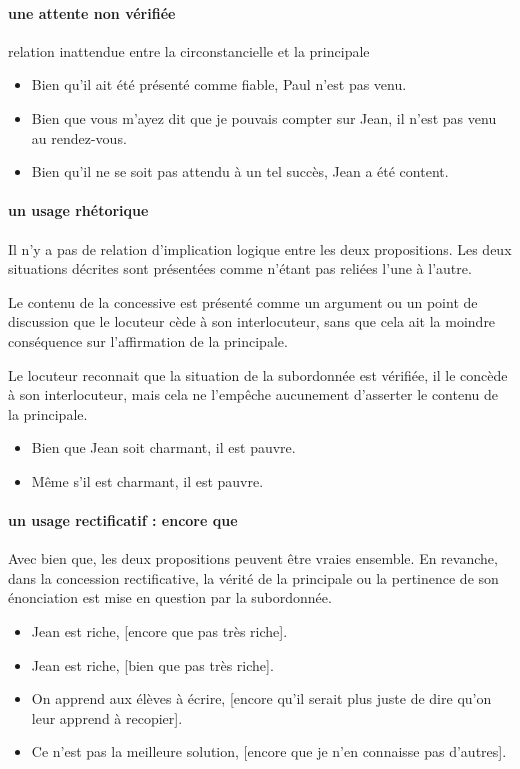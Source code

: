 \documentclass[UTF8]{report}
\begin{document}
\paragraph{une attente non vérifiée }
relation inattendue entre la circonstancielle et la principale
\begin{itemize}
    \item Bien qu’il ait été présenté comme fiable, Paul n’est pas venu.
    \item Bien que vous m’ayez dit que je pouvais compter sur Jean, il n’est pas venu au rendez-vous.
    \item Bien qu’il ne se soit pas attendu à un tel succès, Jean a été content.
\end{itemize}

\paragraph{un usage rhétorique}
Il n’y a pas de relation d’implication logique entre les deux propositions. Les deux situations décrites sont présentées comme n’étant pas reliées l’une à l’autre.

Le contenu de la concessive est présenté comme un argument ou un point de discussion que le locuteur cède à son interlocuteur, sans que cela ait la moindre conséquence sur l’affirmation de la principale. 

Le locuteur reconnait que la situation de la subordonnée est vérifiée, il le concède à son interlocuteur, mais cela ne l’empêche aucunement d’asserter le contenu de la principale. 
\begin{itemize}
    \item Bien que Jean soit charmant, il est pauvre.
    \item Même s’il est charmant, il est pauvre.
\end{itemize}

\paragraph{un usage rectificatif : encore que}
Avec bien que, les deux propositions peuvent être vraies ensemble. En revanche, dans la concession rectificative, la vérité de la principale ou la pertinence de son énonciation est mise en question par la subordonnée.

\begin{itemize}
    \item Jean est riche, [encore que pas très riche].
    \item Jean est riche, [bien que pas très riche].
    \item On apprend aux élèves à écrire, [encore qu’il serait plus juste de dire qu’on leur apprend à recopier].
    \item Ce n’est pas la meilleure solution, [encore que je n’en connaisse pas d’autres].
\end{itemize}
\end{document}

